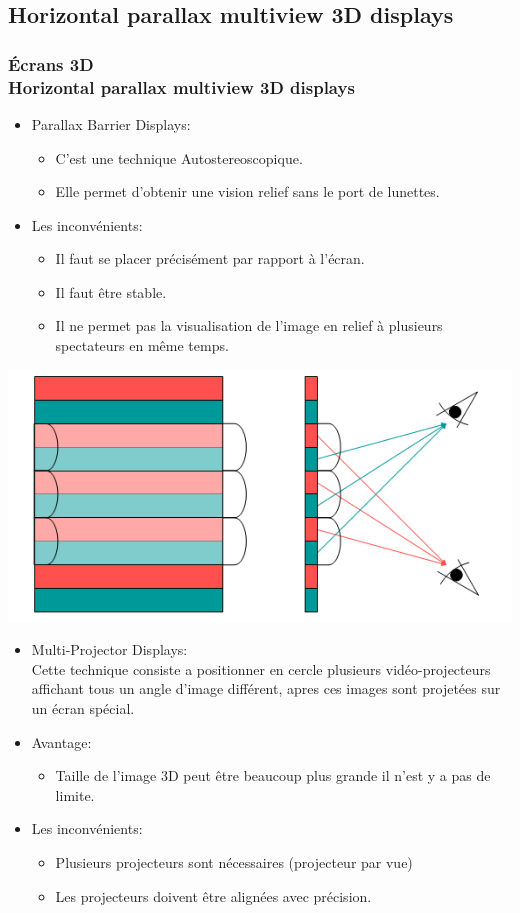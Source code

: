 \subsection{Horizontal parallax multiview 3D displays}	

\begin{frame}

  \frametitle{Écrans 3D \\Horizontal parallax multiview 3D displays} 
  
  \begin{itemize}
  \item Parallax Barrier Displays:
    
    \begin{itemize}
    \item C’est une technique Autostereoscopique.
    \item Elle permet d'obtenir une vision relief sans le port de lunettes.
    \end{itemize}
  \item Les inconvénients:
    \begin{itemize} 	
    \item	Il faut se placer précisément par rapport à l’écran.
    \item Il faut être stable.
    \item Il ne permet pas la visualisation de l’image en relief à plusieurs spectateurs en même temps.
    \end{itemize}
  \end{itemize}
  \includegraphics[keepaspectratio,height=.13\linewidth]{4.png}
\end{frame}

\begin{frame}
  \begin{itemize}
  \item Multi-Projector Displays:\\
    Cette technique consiste a positionner en cercle plusieurs vidéo-projecteurs affichant tous un angle d’image différent, apres ces images sont projetées sur un écran spécial. 						
  \item Avantage:
    \begin{itemize} 
    \item Taille de l’image 3D peut être beaucoup plus grande
      il n’est y a pas de limite.
    \end{itemize}
  \item Les inconvénients:
    \begin{itemize} 	
    \item	Plusieurs projecteurs sont nécessaires (projecteur par vue)
    \item Les projecteurs doivent être alignées avec précision.
    \end{itemize}
  \end{itemize}
\end{frame}

